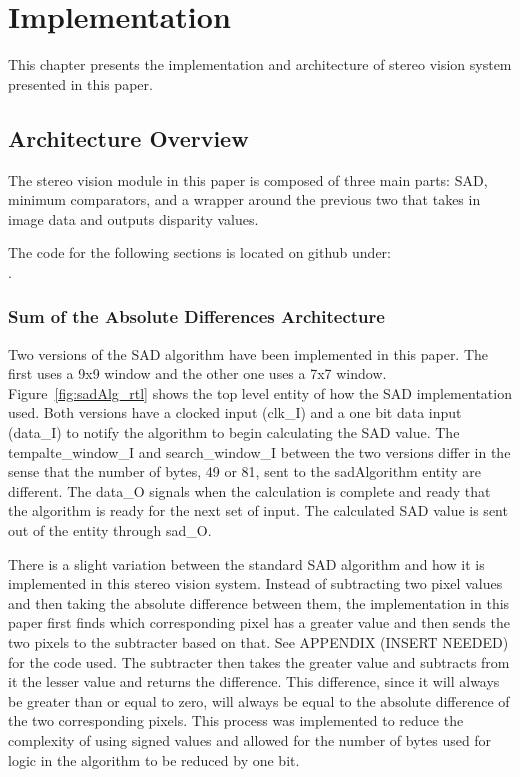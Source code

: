 \chapter{Implementation}
\label{sec:impl}

This chapter presents the implementation and architecture of stereo vision system presented in this paper.

\section{Architecture Overview}

The stereo vision module in this paper is composed of three main parts: SAD, minimum comparators, and a wrapper around the previous two that takes in image data and outputs disparity values.

The code for the following sections is located on github under:
\\.

\subsection{Sum of the Absolute Differences Architecture}

Two versions of the SAD algorithm have been implemented in this paper. The first uses a 9x9 window and the other one uses a 7x7 window. Figure~\ref{fig:sadAlg_rtl} shows the top level entity of how the SAD implementation used. Both versions have a clocked input (clk\_I) and a one bit data input (data\_I) to notify the algorithm to begin calculating the SAD value. The tempalte\_window\_I and search\_window\_I between the two versions differ in the sense that the number of bytes, 49 or 81, sent to the sadAlgorithm entity are different. The data\_O signals when the calculation is complete and ready that the algorithm is ready for the next set of input. The calculated SAD value is sent out of the entity through sad\_O.

There is a slight variation between the standard SAD algorithm and how it is implemented in this stereo vision system. Instead of subtracting two pixel values and then taking the absolute difference between them, the implementation in this paper first finds which corresponding pixel has a greater value and then sends the two pixels to the subtracter based on that. See APPENDIX (INSERT NEEDED) for the code used. The subtracter then takes the greater value and subtracts from it the lesser value and returns the difference. This difference, since it will always be greater than or equal to zero, will always be equal to the absolute difference of the two corresponding pixels. This process was implemented to reduce the complexity of using signed values and allowed for the number of bytes used for logic in the algorithm to be reduced by one bit.

